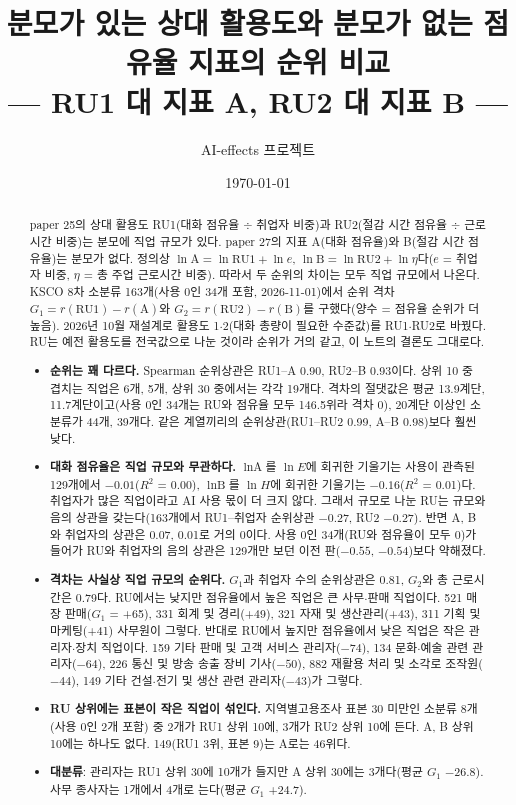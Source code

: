 \documentclass[11pt]{article}
\title{분모가 있는 상대 활용도와 분모가 없는 점유율 지표의 순위 비교\\[2mm]
\large --- RU1 대 지표 A, RU2 대 지표 B ---}
\author{AI-effects 프로젝트}
\date{\today}
\begin{document}
\maketitle

\begin{abstract}
\noindent paper 25의 상대 활용도 RU1(대화 점유율 $\div$ 취업자 비중)과 RU2(절감 시간 점유율 $\div$ 근로시간 비중)는 분모에 직업 규모가 있다. paper 27의 지표 A(대화 점유율)와 B(절감 시간 점유율)는 분모가 없다. 정의상 $\ln \text{A} = \ln \mathrm{RU1} + \ln e$, $\ln \text{B} = \ln \mathrm{RU2} + \ln \eta$다($e$ = 취업자 비중, $\eta$ = 총 주업 근로시간 비중). 따라서 두 순위의 차이는 모두 직업 규모에서 나온다. KSCO 8차 소분류 163개(사용 0인 34개 포함, 2026-11-01)에서 순위 격차 $G_1 = r(\mathrm{RU1}) - r(\text{A})$와 $G_2 = r(\mathrm{RU2}) - r(\text{B})$를 구했다(양수 = 점유율 순위가 더 높음). 2026년 10월 재설계로 활용도 1$\cdot$2(대화 총량이 필요한 수준값)를 RU1$\cdot$RU2로 바꿨다. RU는 예전 활용도를 전국값으로 나눈 것이라 순위가 거의 같고, 이 노트의 결론도 그대로다.
\begin{itemize}[leftmargin=*]
  \item \textbf{순위는 꽤 다르다.} Spearman 순위상관은 RU1--A 0.90, RU2--B 0.93이다. 상위 10 중 겹치는 직업은 6개, 5개, 상위 30 중에서는 각각 19개다. 격차의 절댓값은 평균 13.9계단, 11.7계단이고(사용 0인 34개는 RU와 점유율 모두 146.5위라 격차 0), 20계단 이상인 소분류가 44개, 39개다. 같은 계열끼리의 순위상관(RU1--RU2 0.99, A--B 0.98)보다 훨씬 낮다.
  \item \textbf{대화 점유율은 직업 규모와 무관하다.} $\ln \text{A}$를 $\ln E$에 회귀한 기울기는 사용이 관측된 129개에서 $-0.01$($R^2$ = 0.00), $\ln \text{B}$를 $\ln H$에 회귀한 기울기는 $-0.16$($R^2$ = 0.01)다. 취업자가 많은 직업이라고 AI 사용 몫이 더 크지 않다. 그래서 규모로 나눈 RU는 규모와 음의 상관을 갖는다(163개에서 RU1--취업자 순위상관 $-0.27$, RU2 $-0.27$). 반면 A, B와 취업자의 상관은 0.07, 0.01로 거의 0이다. 사용 0인 34개(RU와 점유율이 모두 0)가 들어가 RU와 취업자의 음의 상관은 129개만 보던 이전 판($-0.55$, $-0.54$)보다 약해졌다.
  \item \textbf{격차는 사실상 직업 규모의 순위다.} $G_1$과 취업자 수의 순위상관은 0.81, $G_2$와 총 근로시간은 0.79다. RU에서는 낮지만 점유율에서 높은 직업은 큰 사무$\cdot$판매 직업이다. 521 매장 판매($G_1$ = +65), 331 회계 및 경리(+49), 321 자재 및 생산관리(+43), 311 기획 및 마케팅(+41) 사무원이 그렇다. 반대로 RU에서 높지만 점유율에서 낮은 직업은 작은 관리자$\cdot$장치 직업이다. 159 기타 판매 및 고객 서비스 관리자($-74$), 134 문화$\cdot$예술 관련 관리자($-64$), 226 통신 및 방송 송출 장비 기사($-50$), 882 재활용 처리 및 소각로 조작원($-44$), 149 기타 건설$\cdot$전기 및 생산 관련 관리자($-43$)가 그렇다.
  \item \textbf{RU 상위에는 표본이 작은 직업이 섞인다.} 지역별고용조사 표본 30 미만인 소분류 8개(사용 0인 2개 포함) 중 2개가 RU1 상위 10에, 3개가 RU2 상위 10에 든다. A, B 상위 10에는 하나도 없다. 149(RU1 3위, 표본 9)는 A로는 46위다.
  \item \textbf{대분류}: 관리자는 RU1 상위 30에 10개가 들지만 A 상위 30에는 3개다(평균 $G_1$ $-26.8$). 사무 종사자는 1개에서 4개로 는다(평균 $G_1$ +24.7).
\end{itemize}
\end{abstract}
\end{document}

